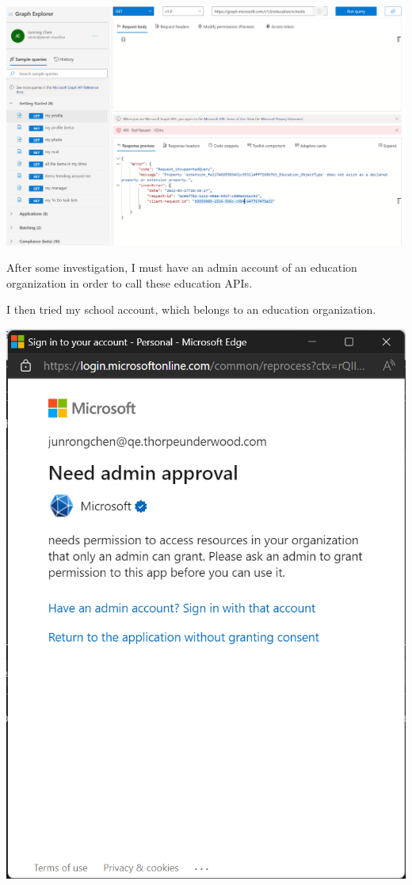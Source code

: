 \documentclass[a4paper]{report}
\begin{document}
\includegraphics[width=\textwidth, height=\textheight, keepaspectratio]{GraphExplorerBadRequest}

After some investigation, I must have an admin account of an education organization in order to call these education APIs.

I then tried my school account, which belongs to an education organization.

\includegraphics[width=\textwidth, height=\textheight, keepaspectratio]{EducationAPINeedApproval}
\end{document}
